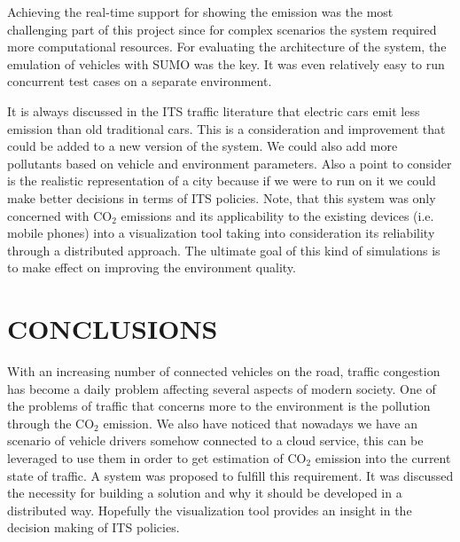 \documentclass[letter, 10pt, conference]{ieeeconf}
\begin{document}
Achieving the real-time support for showing the emission was the most challenging part of this project since for complex scenarios the system required more computational resources.
For evaluating the architecture of the system, the emulation of vehicles with SUMO was the key.
It was even relatively easy to run concurrent test cases on a separate environment.

It is always discussed in the ITS traffic literature that electric cars emit less emission than old traditional cars.
This is a consideration and improvement that could be added to a new version of the system.
We could also add more pollutants based on vehicle and environment parameters.
Also a point to consider is the realistic representation of a city because if we were to run on it we could make better decisions in terms of ITS policies.
Note, that this system was only concerned with CO$_2$ emissions and its applicability to the existing devices (i.e. mobile phones) into a visualization tool taking into consideration its reliability through a distributed approach.
The ultimate goal of this kind of simulations is to make effect on improving the environment quality.

\section{CONCLUSIONS}

With an increasing number of connected vehicles on the road, traffic congestion has become a daily problem affecting several aspects of modern society.
One of the problems of traffic that concerns more to the environment is the pollution through the CO$_2$ emission.
We also have noticed that nowadays we have an scenario of vehicle drivers somehow connected to a cloud service, this can be leveraged to use them in order to get estimation of CO$_2$ emission into the current state of traffic.
A system was proposed to fulfill this requirement.
It was discussed the necessity for building a solution and why it should be developed in a distributed way.
Hopefully the visualization tool provides an insight in the decision making of ITS policies.

\addtolength{\textheight}{-12cm}




\end{document}
